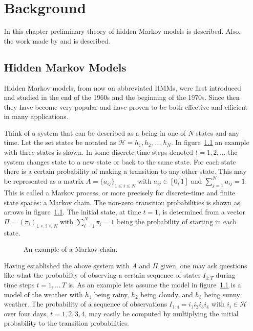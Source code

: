 
\chapter{Background}
\label{cha:background}

In this chapter preliminary theory of hidden Markov models is described. Also,
the work made by \citet{lifshits2009speeding} and \citet{sand2013ziphmmlib} is
described.

\section{Hidden Markov Models}
\label{sec:hidden-markov-models}

Hidden Markov models, from now on abbreviated HMMs, were first introduced and
studied in the end of the 1960s and the beginning of the 1970s. Since then they
have become very popular and have proven to be both effective and efficient in
many applications. \citep{rabiner1989tutorial}

Think of a system that can be described as a being in one of $N$ states and any
time. Let the set states be notated as $\mathcal{H} = {h_1, h_2, \dots, h_N}$.
In figure~\ref{fig:markov-chain} an example with three states is shown. In some
discrete time steps denoted $t = 1, 2, \dots$ the system changes state to a new
state or back to the same state. For each state there is a certain probability
of making a transition to any other state. This may be represented as a matrix
$A = {\{a_{ij}\}}_{1 \le i \le N}$ with $a_{ij} \in [0, 1]$ and
$\sum_{j = 1}^N a_{ij} = 1$. This is called a Markov process, or more precisely
for discrete-time and finite state spaces: a Markov chain. The non-zero
transition probabilities is shown as arrows in
figure~\ref{fig:markov-chain}. The initial state, at time $t = 1$, is
determined from a vector $\Pi = {(\pi_i)}_{1 \le i \le N}$ with
$\sum_{i=1}^N \pi_i = 1$ being the probability of starting in each state.

\begin{figure}
  \centering
  
  \caption{An example of a Markov chain.}
  \label{fig:markov-chain}
\end{figure}

Having established the above system with $A$ and $\Pi$ given, one may ask
questions like what the probability of observing a certain sequence of states
$I_{1:T}$ during time steps $t = 1, \dots\ T$ is. As an example lets assume the
model in figure~\ref{fig:markov-chain} is a model of the weather with $h_1$
being rainy, $h_2$ being cloudy, and $h_3$ being sunny weather. The probability
of a sequence of observations $I_{1:4} = i_1i_2i_3i_4$ with
$i_i \in \mathcal{H}$ over four days, $t = 1, 2, 3, 4$, may easily be computed
by multiplying the initial probability to the transition probabilities.

